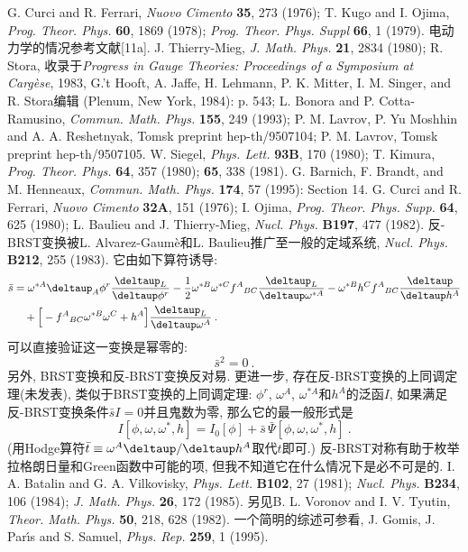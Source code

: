 \begin{thebibliography}{99}
G. Curci and R. Ferrari, {\textit{Nuovo Cimento}} {\bf{35}}, 273 (1976); T. Kugo and I. Ojima, 
{\textit{Prog. Theor. Phys.}} {\bf{60}}, 1869 (1978); {\textit{Prog. Theor. Phys. Suppl}} {\bf{66}}, 1 (1979). 电动力学的情况参考文献[11a]. 
J. Thierry-Mieg, {\textit{J. Math. Phys.}} {\bf{21}}, 2834 (1980); R. Stora, 收录于{\textit{Progress in Gauge Theories: Proceedings of a Symposium at Carg\`{e}se}}, 1983, G.'t Hooft, A. Jaffe, H. Lehmann, P. K. Mitter, I. M. Singer, and R. Stora编辑 (Plenum, New York, 1984): p. 543; L. Bonora and P. Cotta-Ramusino, {\textit{Commun. Math. Phys.}} {\bf{155}}, 249 (1993); P. M. Lavrov, P. Yu Moshhin and A. A. Reshetnyak, Tomsk preprint hep-th/9507104; P. M. Lavrov, Tomsk preprint hep-th/9507105.
W. Siegel, {\textit{Phys. Lett.}} {\bf{93B}}, 170 (1980); T. Kimura, {\textit{Prog. Theor. Phys.}} {\bf{64}}, 357 (1980); {\bf{65}}, 338 (1981).
G. Barnich, F. Brandt, and M. Henneaux, \textit{Commun. Math. Phys.} {\bf{174}}, 57 (1995): Section 14.
G. Curci and R. Ferrari, {\textit{Nuovo Cimento}} {\bf{32A}}, 151 (1976); I. Ojima, {\textit{Prog. Theor. Phys. Supp.}} {\bf{64}}, 625 (1980); L. Baulieu and J. Thierry-Mieg, {\textit{Nucl. Phys.}} {\bf{B197}}, 477 (1982).
反-BRST变换被L. Alvarez-Gaum\`{e}和L. Baulieu推广至一般的定域系统, {\textit{Nucl. Phys.}} {\bf{B212}}, 255 (1983). 它由如下算符诱导:
    \begin{align*}
    \bar{s} &= \omega^{\ast A} \deltaup _{A} \phi^{r} \frac{\deltaup _{L}}{\deltaup  \phi^{r}} - \frac{1}{2}\omega^{\ast B} \omega^{\ast C} f^{A}{}_{BC} \frac{\deltaup _{L}}{\deltaup  \omega^{\ast A}} - \omega^{\ast B} h^{C} f^{A}{}_{BC} \frac{\deltaup }{\deltaup  h^{A}}\\
    &\quad+\Big[ - f^{A}{}_{BC}\omega^{\ast B}\omega^{C} + h^{A} \Big] \frac{\deltaup _{L}}{\deltaup \omega^{A}} \:. 
    \end{align*}
    可以直接验证这一变换是幂零的:
    \[
    \bar{s}^{2}=0 \:. 
    \]
    另外, BRST变换和反-BRST变换反对易. 更进一步, 存在反-BRST变换的上同调定理(未发表), 类似于BRST变换的上同调定理: $\phi^{r}$, $\omega^{A}$, $\omega^{\ast A}$和$h^{A}$的泛函$I$, 如果满足反-BRST变换条件$\bar{s}I=0$并且鬼数为零, 那么它的最一般形式是
    \[
    I[\phi,\omega,\omega^{\ast},h] = I_{0}[\phi] + \bar{s}\,\bar{\Psi}[\phi,\omega,\omega^{\ast},h] \:. 
    \]
    (用Hodge算符$\bar{t}\equiv \omega^{A}\deltaup /\deltaup  h^{A}$取代$t$即可.) 反-BRST对称有助于枚举拉格朗日量和Green函数中可能的项, 但我不知道它在什么情况下是必不可是的.
I. A. Batalin and G. A. Vilkovisky, {\textit{Phys. Lett.}} {\bf{B102}}, 27 (1981); {\textit{Nucl. Phys.}} {\bf{B234}}, 106 (1984); {\textit{J. Math. Phys.}} {\bf{26}}, 172 (1985). 另见B. L. Voronov and I. V. Tyutin, {\textit{Theor. Math. Phys.}} {\bf{50}}, 218, 628 (1982). 一个简明的综述可参看, J. Gomis, J. Par\'{\i}s and S. Samuel, {\textit{Phys. Rep.}} {\bf{259}}, 1 (1995).

\end{thebibliography}
